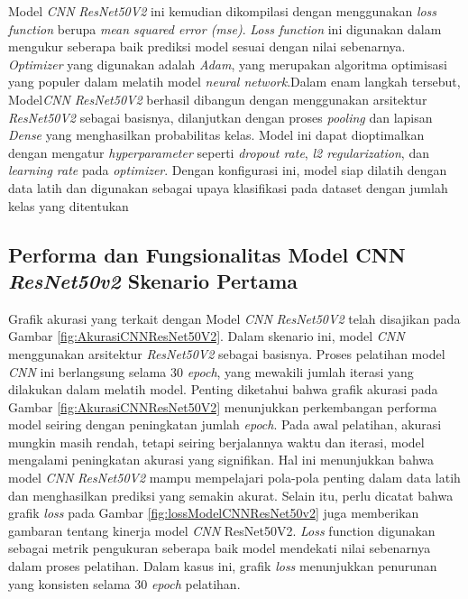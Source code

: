 Model \textit{CNN} \textit{ResNet50V2} ini kemudian dikompilasi dengan menggunakan \textit{loss function} berupa \textit{mean squared error (mse)}. \textit{Loss function} ini digunakan dalam mengukur seberapa baik prediksi model sesuai dengan nilai sebenarnya. \textit{Optimizer} yang digunakan adalah \textit{Adam}, yang merupakan algoritma optimisasi yang populer dalam melatih model \textit{neural network}.Dalam enam langkah tersebut, Model\textit{CNN} \textit{ResNet50V2} berhasil dibangun dengan menggunakan arsitektur \textit{ResNet50V2} sebagai basisnya, dilanjutkan dengan proses \textit{pooling} dan lapisan\textit{ Dense} yang menghasilkan probabilitas kelas. Model ini dapat dioptimalkan dengan mengatur \textit{hyperparameter} seperti \textit{dropout rate}, \textit{l2 regularization}, dan \textit{learning rate} pada \textit{optimizer}. Dengan konfigurasi ini, model siap  dilatih dengan data latih dan digunakan sebagai upaya klasifikasi pada dataset dengan jumlah kelas yang ditentukan

\subsection*{Performa dan Fungsionalitas Model CNN \textit{ResNet50v2} Skenario Pertama}

Grafik akurasi yang terkait dengan Model \textit{CNN} \textit{ResNet50V2} telah disajikan pada Gambar \ref{fig:AkurasiCNNResNet50V2}. Dalam skenario ini, model \textit{CNN} menggunakan arsitektur \textit{ResNet50V2} sebagai basisnya. Proses pelatihan model \textit{CNN} ini berlangsung selama 30 \textit{epoch}, yang mewakili jumlah iterasi yang dilakukan dalam melatih model. Penting diketahui bahwa grafik akurasi pada Gambar \ref{fig:AkurasiCNNResNet50V2} menunjukkan perkembangan performa model seiring dengan peningkatan jumlah \textit{epoch}. Pada awal pelatihan, akurasi mungkin masih rendah, tetapi seiring berjalannya waktu dan iterasi, model mengalami peningkatan akurasi yang signifikan. Hal ini menunjukkan bahwa model \textit{CNN} \textit{ResNet50V2} mampu mempelajari pola-pola penting dalam data latih dan menghasilkan prediksi yang semakin akurat. Selain itu, perlu dicatat bahwa grafik \textit{loss} pada Gambar \ref{fig:lossModelCNNResNet50v2} juga memberikan gambaran tentang kinerja model \textit{CNN} ResNet50V2. \textit{Loss} function digunakan sebagai metrik pengukuran seberapa baik model mendekati nilai sebenarnya dalam proses pelatihan. Dalam kasus ini, grafik \textit{loss} menunjukkan penurunan yang konsisten selama 30 \textit{epoch} pelatihan.


